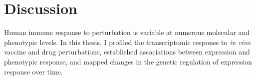 %
%

\chapter{Discussion}
\label{ch:discussion}


Human immune response to perturbation is variable at numerous molecular and phenotypic levels.
In this thesis, I profiled the transcriptomic response to \textit{in vivo} vaccine and drug perturbations,
established associations between expression and phenotypic response,
and mapped changes in the genetic regulation of expression response over time.

